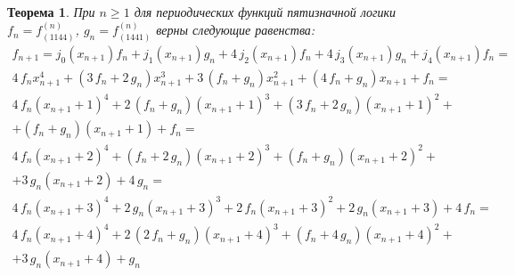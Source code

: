 \documentclass[bibliography=totoc, a4paper, 14pt]{extarticle}
\newtheorem{myth}{Теорема}
\begin{document}
\begin{myth} При $n \geqslant 1 $ для периодических функций пятизначной логики $f_n = f^{\left(n\right)}_{\left(1144\right)}$,
$g_n = f^{\left(n\right)}_{\left(1441\right)}$ верны следующие равенства:
$$\begin{array}{l}
 f_{n+1} = j_0(x_{n+1})f_n + j_1(x_{n+1})g_n + 4\,j_2(x_{n+1})f_n + 4\,j_3(x_{n+1})g_n + j_4(x_{n+1})f_n =\\
4 \, f_{n} x_{n+1}^{4} + {\left(3 \, f_{n} + 2 \, g_{n}\right)} x_{n+1}^{3} + 3 \, {\left(f_{n} + g_{n}\right)} x_{n+1}^{2} + {\left(4 \, f_{n} + g_{n}\right)} x_{n+1} + f_{n}=\\
4 \, f_{n} {\left(x_{n+1} + 1\right)}^{4} + 2 \, {\left(f_{n} + g_{n}\right)} {\left(x_{n+1} + 1\right)}^{3} + {\left(3 \, f_{n} + 2 \, g_{n}\right)} {\left(x_{n+1} + 1\right)}^{2} + \\
+ {\left(f_{n} + g_{n}\right)} {\left(x_{n+1} + 1\right)} + f_{n}=\\
4 \, f_{n} {\left(x_{n+1} + 2\right)}^{4} + {\left(f_{n} + 2 \, g_{n}\right)} {\left(x_{n+1} + 2\right)}^{3} + {\left(f_{n} + g_{n}\right)} {\left(x_{n+1} + 2\right)}^{2} + \\
+ 3 \, g_{n} {\left(x_{n+1} + 2\right)} + 4 \, g_{n}=\\
4 \, f_{n} {\left(x_{n+1} + 3\right)}^{4} + 2 \, g_{n} {\left(x_{n+1} + 3\right)}^{3} + 2 \, f_{n} {\left(x_{n+1} + 3\right)}^{2} + 2 \, g_{n} {\left(x_{n+1} + 3\right)} + 4 \, f_{n}=\\
4 \, f_{n} {\left(x_{n+1} + 4\right)}^{4} + 2 \, {\left(2 \, f_{n} + g_{n}\right)} {\left(x_{n+1} + 4\right)}^{3} + {\left(f_{n} + 4 \, g_{n}\right)} {\left(x_{n+1} + 4\right)}^{2} + \\
 + 3 \, g_{n} {\left(x_{n+1} + 4\right)} + g_{n}\\
\end{array}$$
\end{myth}
\end{document}
